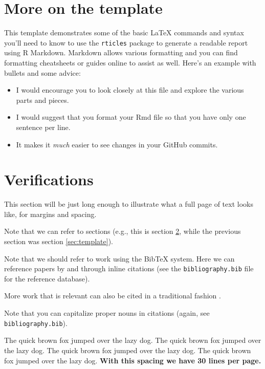 \documentclass[12pt]{article}
\providecommand{\tightlist}{%
  \setlength{\itemsep}{0pt}\setlength{\parskip}{0pt}}
\begin{document}
\hypertarget{more-on-the-template}{%
\section{More on the template}\label{more-on-the-template}}

\label{sec:template}

This template demonstrates some of the basic LaTeX commands and syntax
you'll need to know to use the \texttt{rticles} package to generate a
readable report using R Markdown. Markdown allows various formatting and
you can find formatting cheatsheets or guides online to assist as well.
Here's an example with bullets and some advice:

\begin{itemize}
\tightlist
\item
  I would encourage you to look closely at this file and explore the
  various parts and pieces.
\item
  I would suggest that you format your Rmd file so that you have only
  one sentence per line.
\item
  It makes it \emph{much} easier to see changes in your GitHub commits.
\end{itemize}

\section{Verifications}
\label{sec:verify}

This section will be just long enough to illustrate what a full page of
text looks like, for margins and spacing.

Note that we can refer to sections (e.g., this is section
\ref{sec:verify}, while the previous section was section
\ref{sec:template}).

Note that we should refer to work using the BibTeX system. Here we can
reference papers by \citet{Campbell02} and \citet{Schubert13} through
inline citations (see the \texttt{bibliography.bib} file for the
reference database).

More work that is relevant can also be cited in a traditional fashion
\citep[\citet{Galyardt14mmm},\citet{Galyardt12dis}]{Chi81}.

Note that you can capitalize proper nouns in citations
\citep{Campbell02} (again, see \texttt{bibliography.bib}).

The quick brown fox jumped over the lazy dog. The quick brown fox jumped
over the lazy dog. The quick brown fox jumped over the lazy dog. The
quick brown fox jumped over the lazy dog. \textbf{With this spacing we
have 30 lines per page.}
\end{document}
